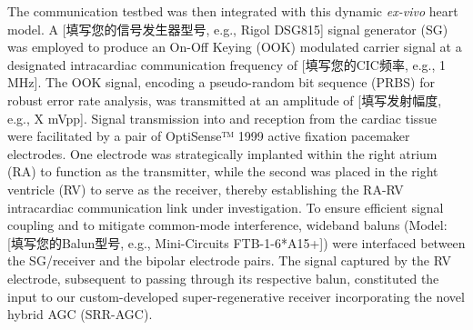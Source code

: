 \documentclass[journal]{IEEEtran}
\begin{document}
The communication testbed was then integrated with this dynamic \textit{ex-vivo} heart model. A [填写您的信号发生器型号, e.g., Rigol DSG815] signal generator (SG) was employed to produce an On-Off Keying (OOK) modulated carrier signal at a designated intracardiac communication frequency of [填写您的CIC频率, e.g., 1 MHz]. The OOK signal, encoding a pseudo-random bit sequence (PRBS) for robust error rate analysis, was transmitted at an amplitude of [填写发射幅度, e.g., X mVpp]. Signal transmission into and reception from the cardiac tissue were facilitated by a pair of OptiSense™ 1999 active fixation pacemaker electrodes. One electrode was strategically implanted within the right atrium (RA) to function as the transmitter, while the second was placed in the right ventricle (RV) to serve as the receiver, thereby establishing the RA-RV intracardiac communication link under investigation. To ensure efficient signal coupling and to mitigate common-mode interference, wideband baluns (Model: [填写您的Balun型号, e.g., Mini-Circuits FTB-1-6*A15+]) were interfaced between the SG/receiver and the bipolar electrode pairs. The signal captured by the RV electrode, subsequent to passing through its respective balun, constituted the input to our custom-developed super-regenerative receiver incorporating the novel hybrid AGC (SRR-AGC).
\end{document}
